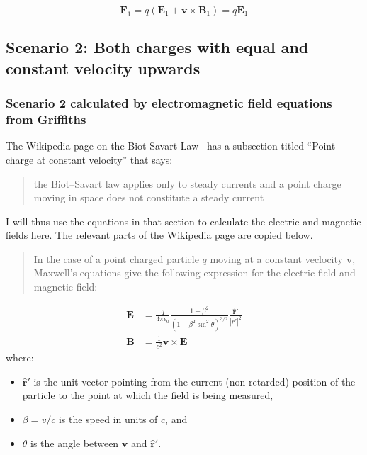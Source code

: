 \documentclass[a4paper]{article}
\theoremstyle{plain}
\theoremstyle{definition}
\newcommand{\rhat}{\hat{\textbf{r}}}
\newcommand{\vect}[1]{\textbf{#1}}
\begin{document}
\begin{equation}
\vect{F}_1 = q(\vect{E}_1 + \vect{v} \times \vect{B}_1)
           = q \vect{E}_1   \label{eq:F1}
\end{equation}


\subsection{Scenario 2: Both charges with equal and constant velocity upwards}

\subsubsection{Scenario 2 calculated by electromagnetic field equations from Griffiths}

The Wikipedia page on the Biot-Savart
Law~\cite{EMFieldFromPointCharge} has a subsection titled ``Point
charge at constant velocity'' that says:

\begin{quote}
the Biot–Savart law applies only to steady currents and a point charge
moving in space does not constitute a steady current
\end{quote}

I will thus use the equations in that section to calculate the
electric and magnetic fields here.  The relevant parts of the
Wikipedia page are copied below.

\begin{quote}
In the case of a point charged particle $q$ moving at a constant
veclocity $\vect{v}$, Maxwell's equations give the following
expression for the electric field and magnetic field:
\end{quote}
\begin{align}
\vect{E} & = \frac{q}{4 \pi \epsilon_0} \frac{1-\beta^2}{(1-\beta^2 \sin^2 \theta)^{3/2}} \frac{{\rhat}'}{|r'|^2} \label{eq:EforPtChg} \\
\vect{B} & = \frac{1}{c^2} \vect{v} \times \vect{E} \label{eq:BforPtChg}
\end{align}
where:
\begin{itemize}
    \item ${\rhat}'$ is the unit vector pointing from the current
      (non-retarded) position of the particle to the point at which
      the field is being measured,
    \item $\beta = v/c$ is the speed in units of $c$, and
    \item $\theta$ is the angle between $\vect{v}$ and ${\rhat}'$.
\end{itemize}
\end{document}
